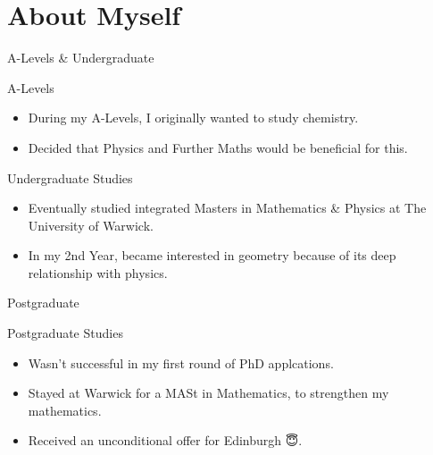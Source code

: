 \section{About Myself}

\begin{frame}{A-Levels \& Undergraduate}

    \begin{block}{A-Levels}
        \begin{itemize}
            \item During my A-Levels, I originally wanted to study chemistry.
            \item Decided that Physics and Further Maths would be beneficial for this.
        \end{itemize}
    \end{block}

    \begin{block}{Undergraduate Studies}
        \begin{itemize}
            \item Eventually studied integrated Masters in Mathematics \& Physics at The University of Warwick.
            \item In my 2nd Year, became interested in geometry because of its deep relationship with physics.
        \end{itemize}
    \end{block}

\end{frame}

\begin{frame}{Postgraduate}

    \begin{block}{Postgraduate Studies}
        \begin{itemize}
            \item Wasn't successful in my first round of PhD applcations.
            \item Stayed at Warwick for a MASt in Mathematics, to strengthen my mathematics.
            \item Received an unconditional offer for Edinburgh {\DejaSans 😇}.
        \end{itemize}
    \end{block}

\end{frame}